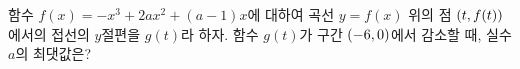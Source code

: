 함수 $f(x)=-x^3+2ax^2+(a-1)x$에 대하여 곡선 $y=f(x)$ 위의 점 $(t{,}\mkern3mu\mathopen{}f(t))$에서의 접선의 $y$절편을 $g(t)$라 하자. 함수 $g(t)$가 구간 $(-6{,}\mkern3mu\mathopen{}0)$에서 감소할 때, 실수 $a$의 최댓값은?
